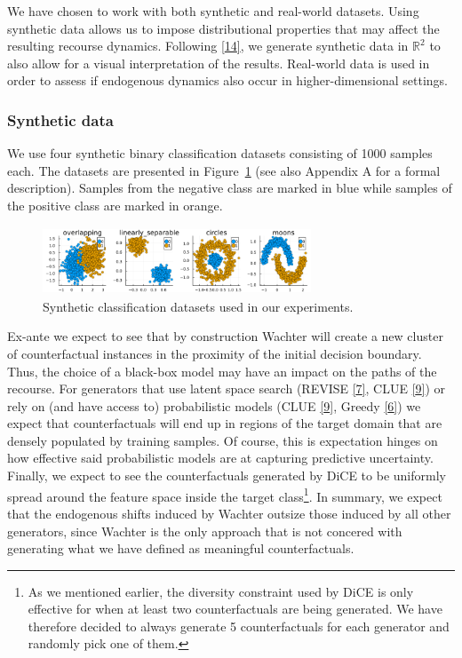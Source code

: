 \documentclass[
  conference]{IEEEtran}
\begin{document}
We have chosen to work with both synthetic and real-world datasets.
Using synthetic data allows us to impose distributional properties that
may affect the resulting recourse dynamics. Following
\protect\hyperlink{ref-upadhyay2021towards}{{[}14{]}}, we generate
synthetic data in \(\mathbb{R}^2\) to also allow for a visual
interpretation of the results. Real-world data is used in order to
assess if endogenous dynamics also occur in higher-dimensional settings.

\hypertarget{synthetic-data}{%
\subsubsection{Synthetic data}\label{synthetic-data}}

We use four synthetic binary classification datasets consisting of 1000
samples each. The datasets are presented in
Figure~\ref{fig-synthetic-data} (see also Appendix A for a formal
description). Samples from the negative class are marked in blue while
samples of the positive class are marked in orange.

\begin{figure}

{\centering \includegraphics[width=8cm,height=2cm]{www/synthetic_data.png}

}

\caption{\label{fig-synthetic-data}Synthetic classification datasets
used in our experiments.}

\end{figure}

Ex-ante we expect to see that by construction Wachter will create a new
cluster of counterfactual instances in the proximity of the initial
decision boundary. Thus, the choice of a black-box model may have an
impact on the paths of the recourse. For generators that use latent
space search (REVISE \protect\hyperlink{ref-joshi2019towards}{{[}7{]}},
CLUE \protect\hyperlink{ref-antoran2020getting}{{[}9{]}}) or rely on
(and have access to) probabilistic models (CLUE
\protect\hyperlink{ref-antoran2020getting}{{[}9{]}}, Greedy
\protect\hyperlink{ref-schut2021generating}{{[}6{]}}) we expect that
counterfactuals will end up in regions of the target domain that are
densely populated by training samples. Of course, this is expectation
hinges on how effective said probabilistic models are at capturing
predictive uncertainty. Finally, we expect to see the counterfactuals
generated by DiCE to be uniformly spread around the feature space inside
the target class\footnote{As we mentioned earlier, the diversity
  constraint used by DiCE is only effective for when at least two
  counterfactuals are being generated. We have therefore decided to
  always generate 5 counterfactuals for each generator and randomly pick
  one of them.}. In summary, we expect that the endogenous shifts
induced by Wachter outsize those induced by all other generators, since
Wachter is the only approach that is not concered with generating what
we have defined as meaningful counterfactuals.
\end{document}
